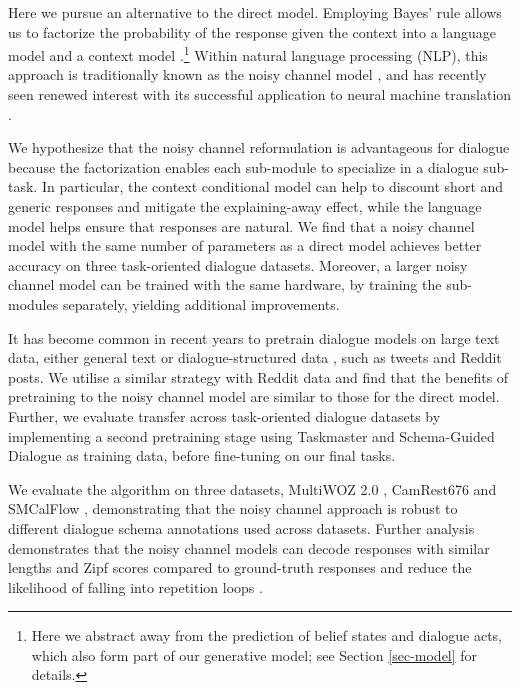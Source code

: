 \documentclass[11pt,a4paper]{article}
\begin{document}
Here we pursue an alternative to the direct model. Employing Bayes' rule allows us to factorize the probability of the response given the context  into a language model  and a context model .\footnote{Here we abstract away from the prediction of belief states and dialogue acts, which also form part of our generative model; see Section \ref{sec-model} for details.}
 Within natural language processing (NLP), this approach is traditionally known as the noisy channel model \cite{shannon48noisy}, and has recently seen renewed interest with its successful application to neural machine translation \cite{yu2016neural,yu2020better,yee2019simple}.





We hypothesize that the noisy channel reformulation is advantageous for dialogue because the factorization enables each sub-module to specialize in a dialogue sub-task. In particular, the context conditional model can help to discount short and generic responses and mitigate the explaining-away effect, while the language model helps ensure that responses are natural. We find that a noisy channel model with the same number of parameters as a direct model achieves better accuracy on three task-oriented dialogue datasets. Moreover, a larger noisy channel model can be trained with the same hardware, by training the sub-modules separately, yielding additional improvements.











It has become common in recent years to pretrain dialogue models on large text data, either general text \cite{peng2020few,budzianowski2019hello,wu2020tod} or dialogue-structured data \cite{roller2020recipes,adiwardana2020towards}, such as tweets and Reddit posts. We utilise a similar strategy with Reddit data and find that the benefits of pretraining to the noisy channel model are similar to those for the direct model. 
Further, we evaluate transfer across task-oriented dialogue datasets by implementing a second pretraining stage using Taskmaster \cite{byrne2019taskmaster} and Schema-Guided Dialogue \cite{rastogi2019towards} as training data, before fine-tuning on our final tasks. 

We evaluate the algorithm on three datasets, MultiWOZ 2.0 \cite{budzianowski2018multiwoz}, CamRest676 \cite{wen2017latent} and SMCalFlow \cite{andreas2020task}, demonstrating that the noisy channel approach is robust to different dialogue schema annotations used across datasets. Further analysis demonstrates that the noisy channel models can decode responses with similar lengths and Zipf scores compared to ground-truth responses and reduce the likelihood of falling into repetition loops \cite{holtzman2019curious}.
\end{document}
